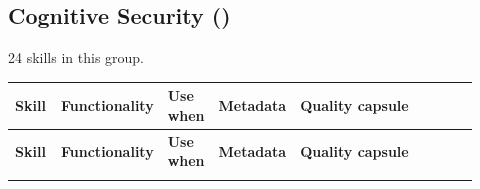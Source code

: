 \documentclass[
]{article}
\renewcommand{\arraystretch}{1.08}
\begin{document}
\subsection{\texorpdfstring{Cognitive Security
()}{Cognitive Security (cognitive_security)}}\label{cognitive-security-cognitive_security}

24 skills in this group.

\begingroup
\scriptsize
\setlength{\tabcolsep}{1.8pt}
\renewcommand{\arraystretch}{1.02}
\begin{longtable}{@{}>{\raggedright\arraybackslash}p{0.105\linewidth}>{\raggedright\arraybackslash}p{0.13\linewidth}>{\raggedright\arraybackslash}p{0.095\linewidth}>{\raggedright\arraybackslash}p{0.135\linewidth}>{\raggedright\arraybackslash}p{0.455\linewidth}@{}}
\toprule
\textbf{Skill} & \textbf{Functionality} & \textbf{Use when} & \textbf{Metadata} & \textbf{Quality capsule}\\
\midrule
\endfirsthead
\toprule
\textbf{Skill} & \textbf{Functionality} & \textbf{Use when} & \textbf{Metadata} & \textbf{Quality capsule}\\
\midrule
\endhead
\bottomrule
\endfoot

\end{longtable}
\end{document}
